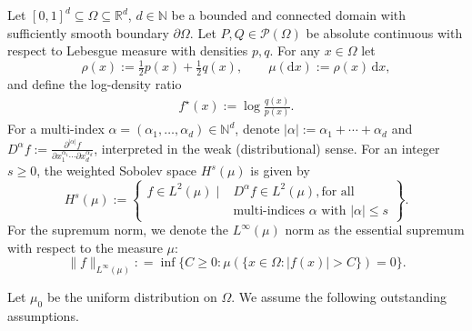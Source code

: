 \documentclass[11pt]{article}
\newcommand{\R}{\mathbb{R}}
\newcommand{\dd}{\mathrm{d}}
\newcommand{\N}{\mathbb{N}}
\theoremstyle{plain}
\theoremstyle{definition}
\theoremstyle{remark}
\begin{document}
Let $[0,1]^d \subseteq\Omega \subseteq \R^d$, $d\in\N$ be a bounded and connected domain with sufficiently smooth boundary $\partial \Omega$. Let $P,Q \in \mathcal{P}(\Omega) $ be absolute continuous with respect to Lebesgue measure with densities $p,q$.
For any $x\in \Omega$ let
\[
  \rho(x):= \tfrac12 p(x) + \tfrac12 q(x), \qquad
  \mu(\dd x):= \rho(x)\,\dd x,
\]
and define the log-density ratio
\begin{eqnarray}\label{eq:f_star}
    f^\star(x):= \log \frac{q(x)}{p(x)}.
\end{eqnarray}
For a multi-index $\alpha=(\alpha_1,\ldots,\alpha_d)\in\mathbb{N}^{d}$,
denote $|\alpha|:=\alpha_1+\cdots+\alpha_d$ and
$
D^\alpha f:=
\frac{\partial^{|\alpha|} f}{\partial x_1^{\alpha_1}\cdots\partial x_d^{\alpha_d}}$,
interpreted in the weak (distributional) sense. For an integer $s\ge 0$, the weighted Sobolev space $H^s(\mu)$ is  given by
\[
H^s(\mu):=
\left\{
\begin{aligned}
f \in L^2(\mu)
\;\big|\;
& D^\alpha f \in L^2(\mu), \text{for all}\\
& \text{multi-indices } \alpha
\text{ with } |\alpha|\le s
\end{aligned}
\right\}.
\]
For the supremum norm, we denote the $L^\infty(\mu)$ norm as the essential supremum with respect to the measure $\mu$:
\[
\|f\|_{L^\infty(\mu)}:
= \inf \bigl\{ C \ge 0: \mu(\{x \in \Omega: |f(x)| > C\}) = 0 \bigr\}.
\]

Let $\mu_0$ be the uniform distribution on $\Omega$. We assume the following outstanding assumptions.
\end{document}

